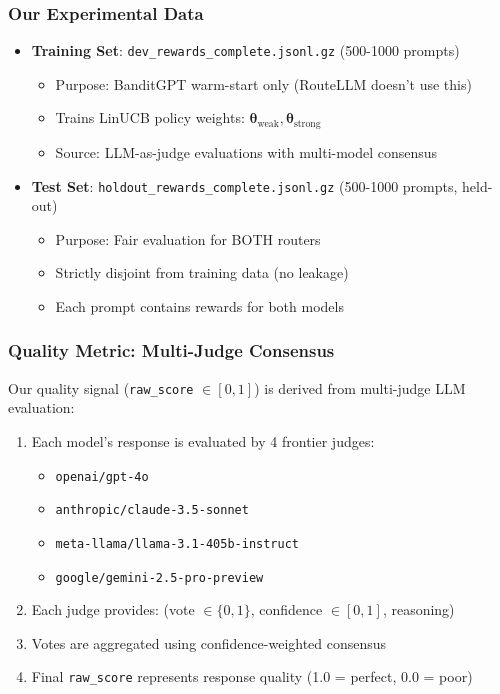 \subsubsection{Our Experimental Data}

\begin{itemize}
    \item \textbf{Training Set}: \texttt{dev\_rewards\_complete.jsonl.gz} (500-1000 prompts)
        \begin{itemize}
            \item Purpose: BanditGPT warm-start only (RouteLLM doesn't use this)
            \item Trains LinUCB policy weights: $\boldsymbol{\theta}_{\text{weak}}, \boldsymbol{\theta}_{\text{strong}}$
            \item Source: LLM-as-judge evaluations with multi-model consensus
        \end{itemize}
    \item \textbf{Test Set}: \texttt{holdout\_rewards\_complete.jsonl.gz} (500-1000 prompts, held-out)
        \begin{itemize}
            \item Purpose: Fair evaluation for BOTH routers
            \item Strictly disjoint from training data (no leakage)
            \item Each prompt contains rewards for both models
        \end{itemize}
\end{itemize}

\subsubsection{Quality Metric: Multi-Judge Consensus}

Our quality signal (\texttt{raw\_score} $\in [0,1]$) is derived from multi-judge LLM evaluation:

\begin{enumerate}
    \item Each model's response is evaluated by 4 frontier judges:
        \begin{itemize}
            \item \texttt{openai/gpt-4o}
            \item \texttt{anthropic/claude-3.5-sonnet}
            \item \texttt{meta-llama/llama-3.1-405b-instruct}
            \item \texttt{google/gemini-2.5-pro-preview}
        \end{itemize}
    \item Each judge provides: (vote $\in \{0,1\}$, confidence $\in [0,1]$, reasoning)
    \item Votes are aggregated using confidence-weighted consensus
    \item Final \texttt{raw\_score} represents response quality (1.0 = perfect, 0.0 = poor)
\end{enumerate}

